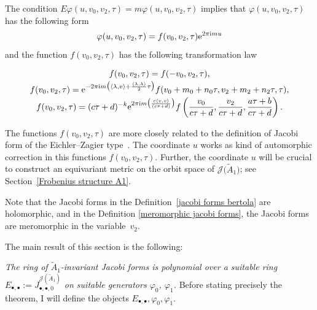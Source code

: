 \documentclass[10pt,a4paper]{amsart}
\numberwithin{equation}{section}
\newcommand{\Ja}{\mathcal{J}}
\begin{document}
\begin{Remark}\label{Remark Zagier Ja1}
The condition $E\varphi(u,v_0,v_2,\tau)=m\varphi(u,v_0,v_2,\tau)$ implies that $\varphi(u,v_0,v_2,\tau)$ has the following form
\begin{gather*}
\varphi(u,v_0,v_2,\tau)=f(v_0,v_2,\tau){\rm e}^{2\pi {\rm i}m u}
\end{gather*}
and the function $f(v_0,v_2,\tau)$ has the following transformation law{\samepage
\begin{gather*}%
f(v_0,v_2,\tau)=f(-v_0,v_2,\tau),
\\[-.5ex]
f(v_0,v_2,\tau)={\rm e}^{-2\pi {\rm i} m\big(\langle \lambda,v \rangle +\frac{\langle\lambda,\lambda \rangle}{2}\tau\big)}f(v_0+m_0+n_0\tau,v_2+m_2+n_2\tau,\tau),
\\[-.5ex]
f(v_0,v_2,\tau)=(c\tau+d)^{-k}{\rm e}^{2\pi {\rm i}m\big(\frac{c\langle v,v \rangle}{(c\tau+d)}\big)}f\left(\frac{v_0}{c\tau+d},\frac{v_2}{c\tau+d},\frac{a\tau+b}{c\tau+d}\right).
\end{gather*}

}

\noindent
The functions $f(v_0,v_2,\tau)$ are more closely related to the definition of Jacobi form of the Eichler--Zagier type~\cite{M.EichlerandD.Zagier}. The coordinate $u$ works as kind of automorphic correction in this functions $f(v_0,v_2,\tau)$. Further, the coordinate $u$ will be crucial to construct an equivariant metric on the orbit space of $\Ja\big(\tilde A_1\big)$; see Section~\ref{Frobenius structure A1}.
\end{Remark}

\begin{Remark}
Note that the Jacobi forms in the Definition~\ref{jacobi forms bertola} are holomorphic, and in the Definition \ref{meromorphic jacobi forms}, the Jacobi forms are meromorphic in the variable~$v_2$.
\end{Remark}

The main result of this section is the following:

 \textit{The ring of $\tilde A_1$-invariant Jacobi forms is polynomial over a suitable ring $E_{\bullet,\bullet}:=J_{\bullet,\bullet,0}^{\Ja(\tilde A_1)}$ on suitable generators $\varphi_0$, $\varphi_1$.} Before stating precisely the theorem, I will define the objects $E_{\bullet,\bullet},\varphi_0,\varphi_1$.
\end{document}

